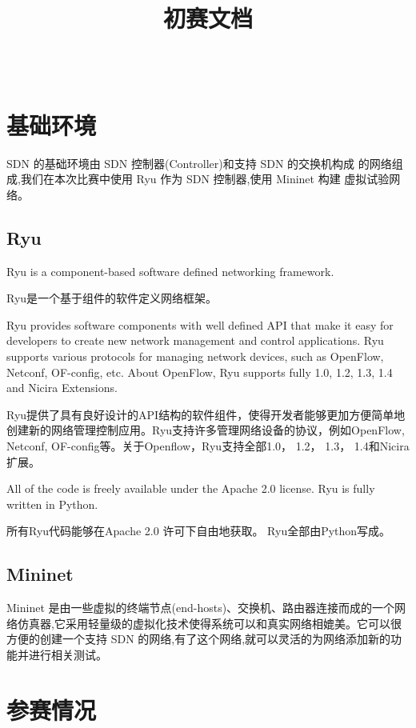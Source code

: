 \documentclass[format=draft,language=chinese,category=SDN]{hustreport}
\title{初赛文档}
\author{\kai{林家军}~~\kai{李英儒}~~\kai{胡云锐}}
\begin{document}
\nocite{*}

\frontmatter
\maketitle
\makeabstract
\tableofcontents
\mainmatter

\chapter{基础环境}\label{chapter:BaiscEnv}
SDN 的基础环境由 SDN 控制器(Controller)和支持 SDN 的交换机构成
的网络组成,我们在本次比赛中使用 Ryu 作为 SDN 控制器,使用 Mininet 构建
虚拟试验网络。
\section{Ryu}
Ryu is a component-based software defined networking framework.

Ryu是一个基于组件的软件定义网络框架。

Ryu provides software components with well defined API that make it easy for developers to create new network management and control applications. Ryu supports various protocols for managing network devices, such as OpenFlow, Netconf, OF-config, etc. About OpenFlow, Ryu supports fully 1.0, 1.2, 1.3, 1.4 and Nicira Extensions.

Ryu提供了具有良好设计的API结构的软件组件，使得开发者能够更加方便简单地创建新的网络管理控制应用。Ryu支持许多管理网络设备的协议，例如OpenFlow, Netconf, OF-config等。关于Openflow，Ryu支持全部1.0， 1.2， 1.3， 1.4和Nicira扩展。

All of the code is freely available under the Apache 2.0 license. Ryu is fully written in Python.

所有Ryu代码能够在Apache 2.0 许可下自由地获取。 Ryu全部由Python写成。

\section{Mininet}
Mininet 是由一些虚拟的终端节点(end-hosts)、交换机、路由器连接而成的一个网络仿真器,它采用轻量级的虚拟化技术使得系统可以和真实网络相媲美。它可以很方便的创建一个支持 SDN 的网络,有了这个网络,就可以灵活的为网络添加新的功能并进行相关测试。

\chapter{参赛情况}\label{chapter:Situation}
\end{document}
